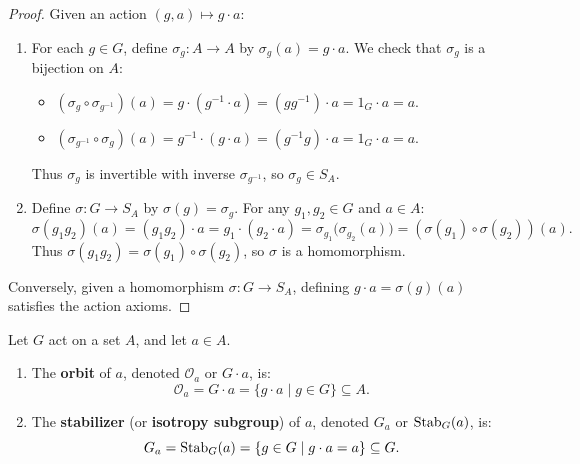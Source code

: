 \begin{proof}
Given an action $(g, a) \mapsto g \cdot a$:
\begin{enumerate}[label=\arabic*., leftmargin=*]
    \item For each $g \in G$, define $\sigma_g: A \to A$ by $\sigma_g(a) = g \cdot a$.
    We check that $\sigma_g$ is a bijection on $A$:
    \begin{itemize}[leftmargin=1.5em, itemsep=3pt]
        \item $(\sigma_g \circ \sigma_{g^{-1}})(a) = g \cdot (g^{-1} \cdot a) = (g g^{-1}) \cdot a = 1_G \cdot a = a$.
        \item $(\sigma_{g^{-1}} \circ \sigma_g)(a) = g^{-1} \cdot (g \cdot a) = (g^{-1} g) \cdot a = 1_G \cdot a = a$.
    \end{itemize}
    Thus $\sigma_g$ is invertible with inverse $\sigma_{g^{-1}}$, so $\sigma_g \in S_A$.
    
    \item Define $\sigma: G \to S_A$ by $\sigma(g) = \sigma_g$. For any $g_1, g_2 \in G$ and $a \in A$:
    \begin{equation*}
    \sigma(g_1 g_2)(a) = (g_1 g_2) \cdot a = g_1 \cdot (g_2 \cdot a) = \sigma_{g_1}\bigl(\sigma_{g_2}(a)\bigr) = (\sigma(g_1) \circ \sigma(g_2))(a).
    \end{equation*}
    Thus $\sigma(g_1 g_2) = \sigma(g_1) \circ \sigma(g_2)$, so $\sigma$ is a homomorphism.
\end{enumerate}
Conversely, given a homomorphism $\sigma: G \to S_A$, defining $g \cdot a = \sigma(g)(a)$ satisfies the action axioms.
\end{proof}

\begin{definition}
Let $G$ act on a set $A$, and let $a \in A$.
\begin{enumerate}[label=\textbf{(\arabic*)}, leftmargin=*, itemsep=4pt]
    \item The \textbf{orbit} of $a$, denoted $\mathcal{O}_a$ or $G \cdot a$, is:
    \begin{equation}
    \mathcal{O}_a = G \cdot a = \{ g \cdot a \mid g \in G \} \subseteq A.
    \end{equation}
    \item The \textbf{stabilizer} (or \textbf{isotropy subgroup}) of $a$, denoted $G_a$ or $\operatorname{Stab}_G(a)$, is:
    \begin{equation}
    G_a = \operatorname{Stab}_G(a) = \{ g \in G \mid g \cdot a = a \} \subseteq G.
    \end{equation}
\end{enumerate}
\end{definition}

